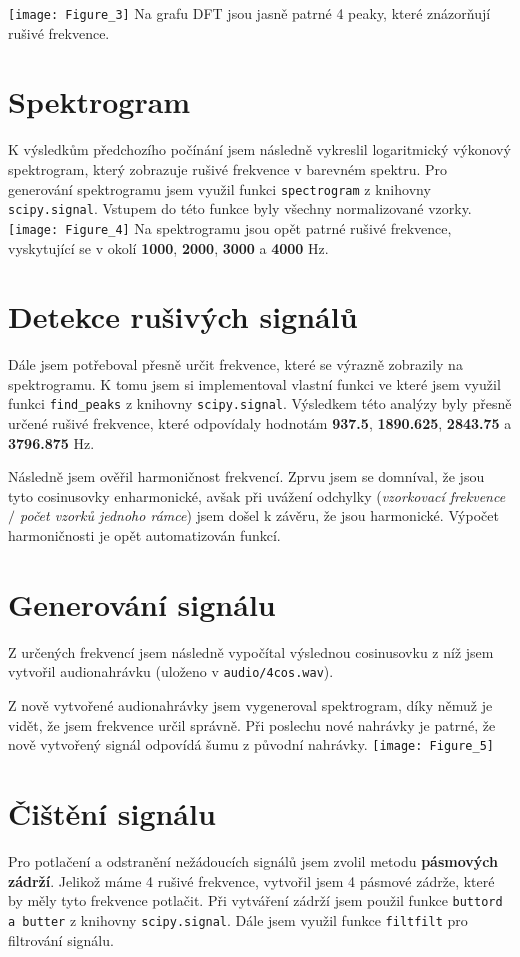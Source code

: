 \documentclass[10pt,a4paper,twocolumn]{article}
\begin{document}
	\hspace*{-0.5cm} 
	\texttt{[image: Figure\_3]}
	Na grafu DFT jsou jasně patrné 4 peaky, které znázorňují rušivé frekvence.
	
	\section{Spektrogram}
	K výsledkům předchozího počínání jsem následně vykreslil logaritmický výkonový spektrogram, který zobrazuje rušivé frekvence v barevném spektru.
	Pro generování spektrogramu jsem využil funkci \texttt{spectrogram} z knihovny \texttt{scipy.signal}. Vstupem do této funkce byly všechny normalizované vzorky.
	\texttt{[image: Figure\_4]}
	Na spektrogramu jsou opět patrné rušivé frekvence, vyskytující se v okolí \textbf{1000}, \textbf{2000}, \textbf{3000} a \textbf{4000} Hz.
	
	\section{Detekce rušivých signálů}
	Dále jsem potřeboval přesně určit frekvence, které se výrazně zobrazily na spektrogramu. K tomu jsem si implementoval vlastní funkci ve které jsem využil funkci \texttt{find\_peaks} z knihovny \texttt{scipy.signal}.
	Výsledkem této analýzy byly přesně určené rušivé frekvence, které odpovídaly hodnotám \textbf{937.5}, \textbf{1890.625}, \textbf{2843.75} a \textbf{3796.875} Hz.
	
	Následně jsem ověřil harmoničnost frekvencí. Zprvu jsem se domníval, že jsou tyto cosinusovky enharmonické, avšak při uvážení odchylky (\textit{vzorkovací frekvence $/$ počet vzorků jednoho rámce}) jsem došel k závěru, že jsou harmonické. Výpočet harmoničnosti je opět automatizován funkcí.
	
	\section{Generování signálu}
	Z určených frekvencí jsem následně vypočítal výslednou cosinusovku z níž jsem vytvořil audionahrávku (uloženo v \texttt{audio/4cos.wav}).
	
	Z nově vytvořené audionahrávky jsem vygeneroval spektrogram, díky němuž je vidět, že jsem frekvence určil správně. Při poslechu nové nahrávky je patrné, že nově vytvořený signál odpovídá šumu z původní nahrávky. 
	\texttt{[image: Figure\_5]}
	
	\section{Čištění signálu}
	Pro potlačení a odstranění nežádoucích signálů jsem zvolil metodu \textbf{pásmových zádrží}. Jelikož máme 4 rušivé frekvence, vytvořil jsem 4 pásmové zádrže, které by měly tyto frekvence potlačit. Při vytváření zádrží jsem použil funkce \texttt{buttord a butter} z knihovny \texttt{scipy.signal}. Dále jsem využil funkce \texttt{filtfilt} pro filtrování signálu.
	
\end{document}
